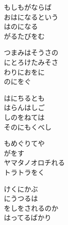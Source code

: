 ﻿\documentclass[10pt,a5j]{tarticle} %
\begin{document}
\begin{enumerate}
\begin{minipage}[c]{\blocksize}

	\vspace{\linespace}
	\item
	もしもがならば\\
	おはになるという\\
	はのになる\\
	がるたびをむ
	
	\vspace{\linespace}
	\item
	つまみはそうさの\\
	にとろけたみそさ\\
	わりにおをに\\
	のにをぐ
	
	\vspace{\linespace}
	\item
	はにちるとも\\
	はらんはしご\\
	しのをねては\\
	そのにもくべし
	
	\vspace{\linespace}
	\item
	もめぐりてや\\
	がをす\\
	ヤマタノオロチれる\\
	トラトラをく
	
\end{minipage}
\begin{minipage}[c]{\blocksize}

	\vspace{\linespace}
	\item
	けくにかぶ\\
	にうつるは\\
	をしをされるのか\\
	はってるばかり
	

\end{minipage}
\end{enumerate}
\end{document}
